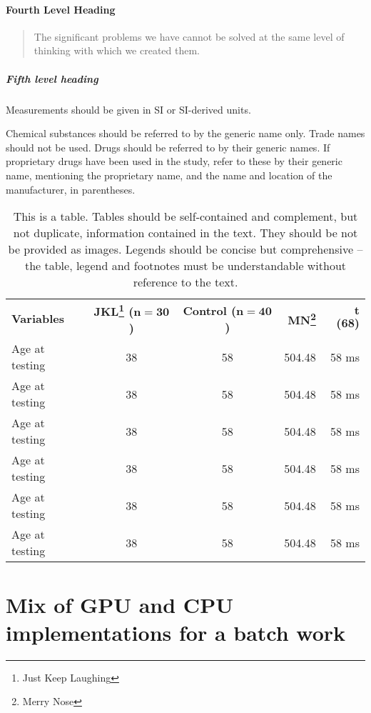 \documentclass[num-refs]{wiley-article}
\begin{document}
\paragraph{Fourth Level Heading}

\begin{quote}
The significant problems we have cannot be solved at the same level of thinking with which we created them.
\end{quote}


\subparagraph{Fifth level heading}
Measurements should be given in SI or SI-derived units.


Chemical substances should be referred to by the generic name only. Trade names should not be used. Drugs should be referred to by their generic names. If proprietary drugs have been used in the study, refer to these by their generic name, mentioning the proprietary name, and the name and location of the manufacturer, in parentheses.
\begin{table}
\caption{{This is a table. Tables should be self-contained and complement, but not duplicate, information contained in the text. They should be not be provided as images. Legends should be concise but comprehensive -- the table, legend and footnotes must be understandable without reference to the text.}}
\begin{tabular}{lccrr}
\hline
\textbf{Variables} & \textbf{JKL\footnote{Just Keep Laughing} ($\boldsymbol{n=30}$)} & \textbf{Control ($\boldsymbol{n=40}$)} & \textbf{MN\footnote{Merry Nose}} & \textbf{$\boldsymbol t$ (68)}\\
Age at testing & 38 & 58 & 504.48 & 58 ms\\
Age at testing & 38 & 58 & 504.48 & 58 ms\\
Age at testing & 38 & 58 & 504.48 & 58 ms\\
Age at testing & 38 & 58 & 504.48 & 58 ms\\
Age at testing & 38 & 58 & 504.48 & 58 ms\\
Age at testing & 38 & 58 & 504.48 & 58 ms\\
\hline  
\end{tabular}
\end{table}

% 
% 
% 
% 
%

\section{Mix of GPU and CPU implementations for a batch work}
\end{document}
